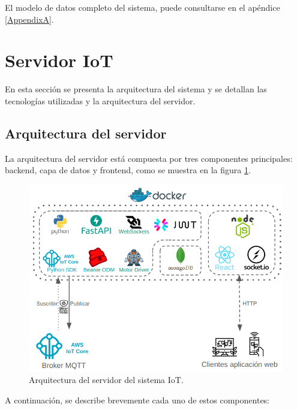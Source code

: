 El modelo de datos completo del sistema, puede consultarse en el apéndice
\ref{AppendixA}.

\section{Servidor IoT}

En esta sección se presenta la arquitectura del sistema y se detallan las
tecnologías utilizadas y la arquitectura del servidor.

\subsection{Arquitectura del servidor}

\label{sec:arquitecturaServidor}

La arquitectura del servidor está compuesta por tres componentes principales:
backend, capa de datos y frontend, como se muestra en la figura
\ref{fig:arquitectura servidor}.

\begin{figure}[H]
    \centering
    \includegraphics[width=.97\textwidth]{./Images/16.png}
    \caption{Arquitectura del servidor del sistema IoT.}
    \label{fig:arquitectura servidor}
\end{figure}

A continuación, se describe brevemente cada uno de estos componentes:

